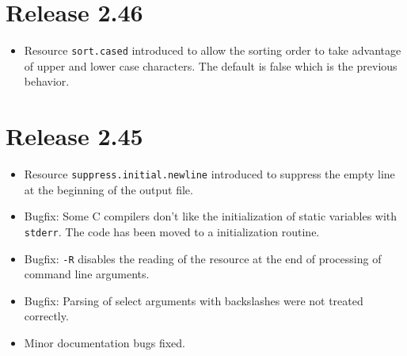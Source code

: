 \documentclass[11pt,a4paper]{scrartcl}
\newcommand\rsc[1]{\texttt{#1}}
\newenvironment{Release}[2]{\section*{Release #1}\begin{itemize}}{\end{itemize}}
\newenvironment{Fix}[1]{\item }{}
\newenvironment{New}[1]{\item }{}
\newenvironment{Doc}[1]{\item }{}
\begin{document}
 \begin{Release}{2.46}{February 12 2002}
  \begin{New}{gene}
    Resource \rsc{sort.cased} introduced to allow the sorting order to
    take advantage of upper and lower case characters. The default is false
    which is the previous behavior.
  \end{New}
 \end{Release}

 \begin{Release}{2.45}{October 22 2001}
  \begin{New}{gene}
    Resource \rsc{suppress.initial.newline} introduced to suppress the
    empty line at the beginning of the output file.
  \end{New}
  \begin{Fix}{gene}
    Bugfix: Some C compilers don't like the initialization of static variables
    with \texttt{stderr}. The code has been moved to a initialization routine.
  \end{Fix}
  \begin{Fix}{gene}
    Bugfix: \texttt{-R} disables the reading of the resource at the end of
    processing of command line arguments.
  \end{Fix}
  \begin{Fix}{gene}
    Bugfix: Parsing of select arguments with backslashes were not treated
    correctly.
  \end{Fix}
  \begin{Doc}{gene}
    Minor documentation bugs fixed.
  \end{Doc}
 \end{Release}
\end{document}
